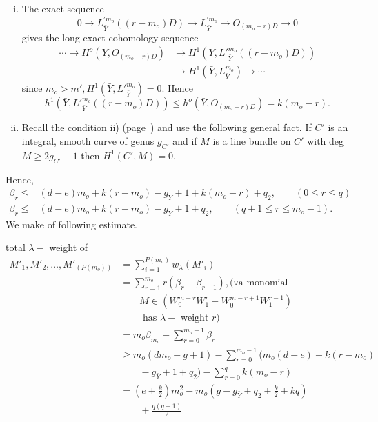 {\begin{enumerate}[i)]
\item The exact sequence
$$
0 \to L^{'m_o}_{\bar{Y}} ((r-m_o)D) \to L^{'m_o}_{\bar{Y}} \to O_{(m_o
  - r)D} \to 0 
$$
gives the long exact cohomology sequence
\begin{align*}
\cdots \to H^o(\bar{Y}, O_{(m_o-r)D})& \to H^1 (\bar{Y},
L'^{m_o}_{\bar{Y}}((r-m_o)D))\\ 
&\to H^{1}(\bar{Y}, L^{m_o}_{\bar{Y}})
\to \cdots 
\end{align*}
since $m_o > m', H^{1}(\bar{Y}, L'^{m_o}_{\bar{Y}})=0$. Hence
$$
h^{1}(\bar{Y}, L'^{m_o}_{\bar{Y}}((r-m_o)D)) \le h^o (\bar{Y}, O_{(m_o
  - r)D})=k(m_o-r). 
$$

\item Recall the condition ii) (page~\pageref{c1:cond2}) and use the following
  general fact. If $C'$ is an integral, smooth curve of genus $g_{C'}$
  and if $M$ is a line bundle on $C'$ with deg $M \geq 2g_{C'}-1$ then
  $H^1 (C', M)=0$.
\end{enumerate}

Hence, 
\begin{align*}
\beta_r \le & (d - e)m_o + k(r - m_o) - g_{\bar{Y}} + 1 + k(m_o -r) +
q_2, \qquad (0 \le r \le q)\\ 
\beta_r \le & (d - e)m_o + k(r - m_o) - g_{\bar{Y}} + 1 + q_2, \qquad
(q + 1 \le r \le m_o - 1). 
\end{align*}
We make of following estimate.

\noindent
total $\lambda-$ weight of 
\begin{align*}
M'_{1}, M'_{2},\ldots, M'_{(P(m_o))} &=
\sum\limits^{P(m_o)}_{i=1} w_{\lambda}(M'_{i})\\ 
& = \sum^{m_o}_{r = 1} r (\beta_r - \beta_{r - 1}),(\because 
\text{a monomial}\\ 
&\qquad M \in (W^{m-r}_0 W^r_1 - W^{m-r+1}_0
  W^{r-1}_{1})\\ 
&\qquad\text{ has } \lambda-\text{ weight } r)\\ 
& = m_o \beta_{m_o} - \sum^{m_o -1}_{r = 0} \beta_r\\
& \ge m_o (dm_o - g + 1) - \sum^{m_o -1}_{r =0} (m_o (d -e) + k (r -
  m_o)\\ 
&\qquad - g_{\bar{Y}} + 1 + q_2) - \sum\limits^{q}_{r = 0} k(m_o - r)\\ 
& =  \left(e + \frac{k}{2}\right) m^{2}_{o} - m_o \left(g - g_{\bar{Y}} + q_2 +\frac{k}{2}
  + kq\right)\\ 
&\qquad + \frac{q(q+ 1)}{2} 
\end{align*}\pageoriginale

}
